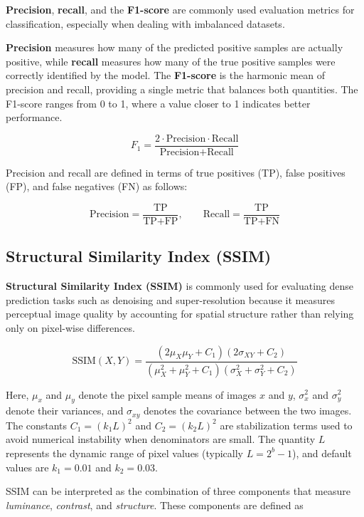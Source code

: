 \documentclass{article}
\begin{document}
\textbf{Precision}, \textbf{recall}, and the \textbf{F1-score} are commonly used evaluation metrics for classification, especially when dealing with imbalanced datasets.

\textbf{Precision} measures how many of the predicted positive samples are actually positive, while \textbf{recall} measures how many of the true positive samples were correctly identified by the model. The \textbf{F1-score} is the harmonic mean of precision and recall, providing a single metric that balances both quantities. The F1-score ranges from 0 to 1, where a value closer to 1 indicates better performance.

\[
F_1 = \frac{2 \cdot \text{Precision} \cdot \text{Recall}}{\text{Precision} + \text{Recall}}
\]

Precision and recall are defined in terms of true positives (TP), false positives (FP), and false negatives (FN) as follows:

\[
\text{Precision} = \frac{\text{TP}}{\text{TP} + \text{FP}}, \qquad
\text{Recall} = \frac{\text{TP}}{\text{TP} + \text{FN}}
\]

\subsection{Structural Similarity Index (SSIM)}

\textbf{Structural Similarity Index (SSIM)} is commonly used for evaluating dense prediction tasks such as denoising and super-resolution because it measures perceptual image quality by accounting for spatial structure rather than relying only on pixel-wise differences.

\[
\text{SSIM}(X, Y) =
\frac{(2\mu_X\mu_Y + C_1)(2\sigma_{XY} + C_2)}
{(\mu_X^2 + \mu_Y^2 + C_1)(\sigma_X^2 + \sigma_Y^2 + C_2)}
\]

Here, \(\mu_x\) and \(\mu_y\) denote the pixel sample means of images \(x\) and \(y\), \(\sigma_x^2\) and \(\sigma_y^2\) denote their variances, and \(\sigma_{xy}\) denotes the covariance between the two images. The constants \(C_1=(k_1L)^2\) and \(C_2=(k_2L)^2\) are stabilization terms used to avoid numerical instability when denominators are small. The quantity \(L\) represents the dynamic range of pixel values (typically \(L=2^b-1\)), and default values are \(k_1=0.01\) and \(k_2=0.03\).

SSIM can be interpreted as the combination of three components that measure \textit{luminance}, \textit{contrast}, and \textit{structure}. These components are defined as
\end{document}
